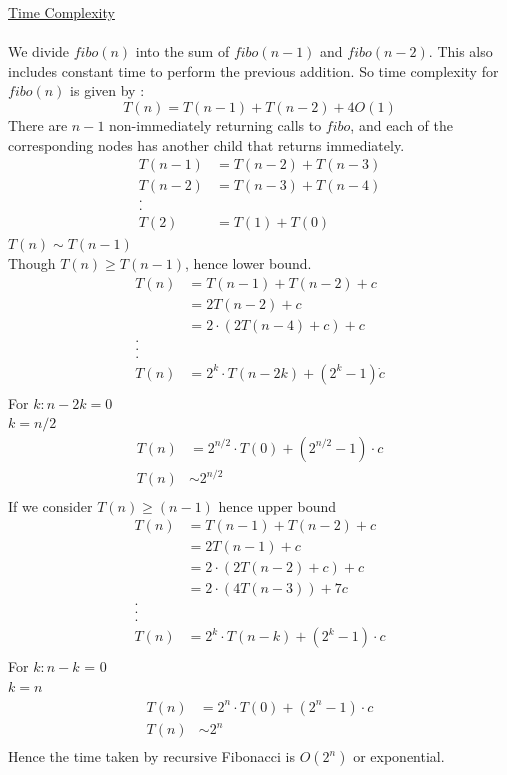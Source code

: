 \documentclass[12pt]{book}
\begin{document}
\underline{Time Complexity}\\\\
 We divide $fibo(n)$ into the sum of $fibo(n-1)$ and $fibo(n-2)$. This also includes constant time to perform the previous addition. So time complexity for $fibo(n)$ is given by :
    \[T(n)=T(n-1)+T(n-2)+4O(1)\]
There are $n-1$ non-immediately returning calls to $fibo$, and each of the corresponding nodes has another child that returns immediately.\\
\begin{align*}
    T(n-1) &=T(n-2)+T(n-3) \\
    T(n-2) &=T(n-3)+T(n-4) \\    
	.\\
    .\\
    T(2) &=T(1)+T(0)
\end{align*}
	$T(n) \sim T(n-1)$ \\
	Though $T(n) \geq T(n-1)$, hence lower bound.
\begin{align*}
    T(n) &= T(n-1) + T(n-2) + c \\
            &= 2T(n-2) + c\\
        &= 2 \cdot (2T(n-4) + c) + c \\
        .\\
        . \\  
        .\\
    T(n) &= 2^k \cdot T(n - 2k) + (2^k -1 )\dot c \\
\end{align*}
	For $k : n-2k = 0$ \\
	$k=n/2$ 
\begin{align*}
    T(n) &= 2^{n/2} \cdot T(0) + (2^{n/2} - 1) \cdot c \\
    T(n) &\sim 2^{n/2} \\
\end{align*}
If we consider $T(n) \geq (n-1)$ hence upper bound\\
\begin{align*}
    T(n) &= T(n-1) + T(n-2) + c \\
            &= 2T(n-1) + c \\
        &= 2 \cdot (2T(n-2) + c) + c \\
        &= 2 \cdot (4T(n-3)) + 7c \\
        .\\
        .  \\  
        .\\
    T(n) &= 2^k \cdot T(n - k) + (2^k -1 ) \cdot c \\
\end{align*}
For $k: n-k$ = 0 \\
$k=n$ 
\begin{align*}
    T(n) &= 2^n \cdot T(0) + (2^n  - 1) \cdot c \\
    T(n) &\sim 2^n \\
\end{align*}
Hence the time taken by recursive Fibonacci is $O(2^n)$ or exponential.\\
\end{document}
